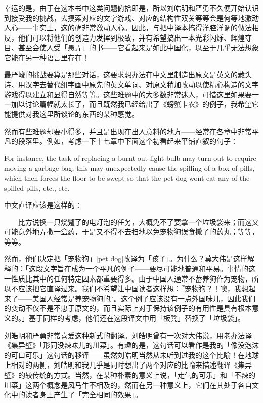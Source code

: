 \documentclass[
  12pt,
  twoside,
  openright,
  oldfontcommands,
]{memoir}
\begin{document}
幸运的是，由于在这本书中这类问题俯拾即是，所以刘皓明和严勇不久便开始认识到接受我的挑战，去摸索对应的文字游戏、对应的结构性双关等等会是何等地激动人心------事实上，这的确非常激动人心。因此，与把中译本搞得洋腔洋调的做法相反，他们可以将他们的创造力发挥到极致，并有希望搞出一本光彩闪烁、辉煌夺目、甚至会使人受「愚弄」的书------它看起来是如此中国化，以至于几乎无法想象它能在另一种语言里存在！

最严峻的挑战要算是那些对话，这要求想办法在中文里制造出原文是英文的藏头诗、用汉字去替代组字画中原先的英文单词、对原文稍加改动以使精心构造的文字游戏得以建立和显得自然等等。这些难题中的大多数非常迷人，可惜这里如果要一一加以讨论篇幅就太长了，而且既然我已经给出了《螃蟹卡农》的例子，我希望它能提供对我这里所谈论的东西的某种感觉。

然而有些难题却要小得多，并且是出现在出人意料的地方------经常在各章中非常平凡的段落里。例如，考虑一下十七章中下面这个初看起来平铺直叙的句子：

For instance, the task of replacing a burnt-out light bulb may turn out
to require moving a garbage bag; this may unexpectedly cause the
spilling of a box of pills, which then forces the floor to be swept so
that the pet dog won\textquotesingle t eat any of the spilled pills,
etc., etc.

中文直译应该是这样的：

　　比方说换一只烧蹩了的电灯泡的任务，大概免不了要拿一个垃圾袋来；而这又可能意外地弄撒一盒药，于是又不得不去扫地以免宠物狗误食撒了的药丸；等等，等等。

然而，他们决定把「宠物狗」{[}pet
dog{]}改译为「孩子」。为什么？莫大伟是这样解释的：「这段文字旨在成为一个平凡的例子------要尽可能地普通和平易。事情的这一性质比其中的任何特定因素都重要得多。由于中国人通常不蓄养狗作为宠物，所以不应该把它直译过来。我们不希望让中国读者这样想：『宠物狗？！噢，我想起来了------美国人经常是养宠物狗的』。这个例子应该没有一点外国味儿，因此我们的变动不仅不是不忠于原文的，而且实际上对于保持该例子的有用性是具有根本意义的。」基于同样的考虑，他们还在这段译文中用「板凳」替换了「垃圾袋」。

刘皓明和严勇非常喜爱这种新式的翻译。刘皓明曾有一次对大伟说，用老办法译《集异璧》「形同没辣味儿的川菜」。有趣的是，这句话可以看作是我的「像没泡沫的可口可乐」这句话的移译------虽然刘皓明当然从未听到过我的这个比喻！在地球上相对的两侧，刘皓明和我几乎是同时想出了两个对应的比喻来描述翻译《集异璧》的较传统的方式。当然，在某种朴素的意义上说，「走气的可乐」和「不辣的川菜」这两个概念是风马牛不相及的，然而在另一种意义上，它们在其处于各自文化中的读者身上产生了「完全相同的效果」。
\end{document}
